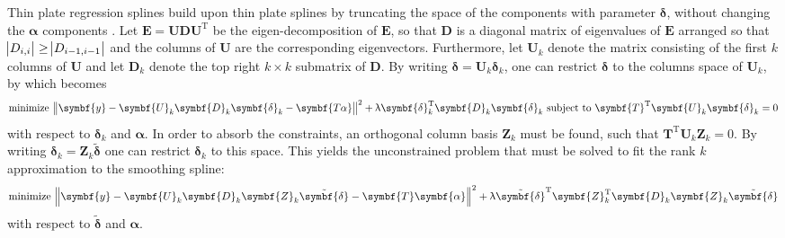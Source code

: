Thin plate regression splines build upon thin plate splines by truncating the space of the components with parameter \(\symbf{\delta}\), without changing the \(\symbf{\alpha}\) components \parencite{Wood2006}.  Let \(\symbf{E} = \symbf{U D U}^{\text{T}}\) be the eigen-decomposition of \(\symbf{E}\), so that \(\symbf{D}\) is a diagonal matrix of eigenvalues of \(\symbf{E}\) arranged so that \(\abs{D_{i, i}} \geq \abs{D_{i-1, i-1}}\) and the columns of \(\symbf{U}\) are the corresponding eigenvectors. Furthermore, let \(\symbf{U}_k\) denote the matrix consisting of the first \(k\) columns of \(\symbf{U}\) and let \(\symbf{D}_k\) denote the top right \(k \times k\) submatrix of \(\symbf{D}\).  By writing \(\symbf{\delta} = \symbf{U}_k \symbf{\delta}_k\), one can restrict \(\symbf{\delta}\) to the columns space of \(\symbf{U}_k\), by which  becomes
\begin{equation}
  \label{eq:ThinPlateRegressionSplinesSimplifiedFittingProblem}
  \text{minimize } \norm{\symbf{y} - \symbf{U}_k\symbf{D}_k\symbf{\delta}_k - \symbf{T \alpha}}^2 + \uplambda \symbf{\delta}_k^{\text{T}} \symbf{D}_k \symbf{\delta}_k \text{ subject to } \symbf{T}^{\text{T}} \symbf{U}_k \symbf{\delta}_k = 0
\end{equation}
with respect to \(\symbf{\delta}_k\) and \(\symbf{\alpha}\).  In order to absorb the constraints, an orthogonal column basis \(\symbf{Z}_k\) must be found, such that \(\symbf{T}^{\text{T}} \symbf{U}_k \symbf{Z}_k = 0\).  By writing \(\symbf{\delta}_k = \symbf{Z}_k \tilde{\symbf{\delta}}\) one can restrict \(\symbf{\delta}_k\) to this space.  This yields the unconstrained problem that must be solved to fit the rank \(k\) approximation to the smoothing spline:
\begin{equation}
  \label{eq:ThinPlateRegressionSplinesUnconstrainedFittingProblem}
  \text{minimize } \norm{\symbf{y} - \symbf{U}_k \symbf{D}_k \symbf{Z}_k \tilde{\symbf{\delta}} - \symbf{T} \symbf{\alpha}}^2 + \uplambda \tilde{\symbf{\delta}}^{\text{T}} \symbf{Z}_k^{\text{T}} \symbf{D}_k \symbf{Z}_k \tilde{\symbf{\delta}}
\end{equation}
with respect to \(\tilde{\symbf{\delta}}\) and \(\symbf{\alpha}\).

